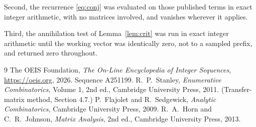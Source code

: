 \documentclass[11pt,a4paper]{article}
\theoremstyle{plain}
\theoremstyle{definition}
\begin{document}
Second, the recurrence \eqref{eq:conj} was evaluated on those published terms in exact
integer arithmetic, with no matrices involved, and vanishes wherever it applies.

Third, the annihilation test of Lemma~\ref{lem:crit} was run in exact integer arithmetic
until the working vector was identically zero, not to a sampled prefix, and returned zero
throughout.

\begin{thebibliography}{9}
 The OEIS Foundation, \emph{The On-Line Encyclopedia of Integer
Sequences}, \url{https://oeis.org}, 2026. Sequence A251199.
 R.~P.~Stanley, \emph{Enumerative Combinatorics}, Volume 1, 2nd ed.,
Cambridge University Press, 2011. (Transfer-matrix method, Section 4.7.)
 P.~Flajolet and R.~Sedgewick, \emph{Analytic Combinatorics}, Cambridge
University Press, 2009.
 R.~A.~Horn and C.~R.~Johnson, \emph{Matrix Analysis}, 2nd ed., Cambridge
University Press, 2013.
\end{thebibliography}
\end{document}
